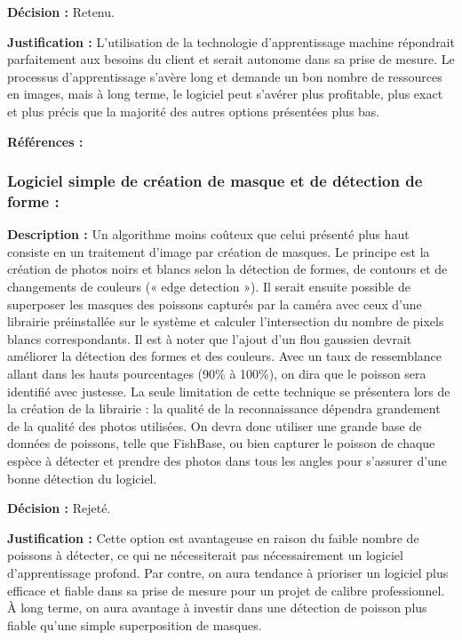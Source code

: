 \textbf{Décision :} Retenu.

\textbf{Justification :} L’utilisation de la technologie d’apprentissage machine répondrait parfaitement aux besoins du client et serait autonome dans sa prise de mesure. Le processus d’apprentissage s’avère long et demande un bon nombre de ressources en images, mais à long terme, le logiciel peut s’avérer plus profitable, plus exact et plus précis que la majorité des autres options présentées plus bas. 

\textbf{Références :} \cite{tensorflow}


\subsubsection{Logiciel simple de création de masque et de détection de forme :}

\textbf{Description :} Un algorithme moins coûteux que celui présenté plus haut consiste en un traitement d’image par création de masques. Le principe est la création de photos noirs et blancs selon la détection de formes, de contours et de changements de couleurs (« edge detection »). Il serait ensuite possible de superposer les masques des poissons capturés par la caméra avec ceux d’une librairie préinstallée sur le système et calculer l’intersection du nombre de pixels blancs correspondants. Il est à noter que l’ajout d’un flou gaussien devrait améliorer la détection des formes et des couleurs. Avec un taux de ressemblance allant dans les hauts pourcentages (90\% à 100\%), on dira que le poisson sera identifié avec justesse. La seule limitation de cette technique se présentera lors de la création de la librairie : la qualité de la reconnaissance dépendra grandement de la qualité des photos utilisées. On devra donc utiliser une grande base de données de poissons, telle que FishBase, ou bien capturer le poisson de chaque espèce à détecter et prendre des photos dans tous les angles pour s’assurer d’une bonne détection du logiciel. 

\textbf{Décision :} Rejeté.

\textbf{Justification :} Cette option est avantageuse en raison du faible nombre de poissons à détecter, ce qui ne nécessiterait pas nécessairement un logiciel d’apprentissage profond. Par contre, on aura tendance à prioriser un logiciel plus efficace et fiable dans sa prise de mesure pour un projet de calibre professionnel. À long terme, on aura avantage à investir dans une détection de poisson plus fiable qu’une simple superposition de masques.

